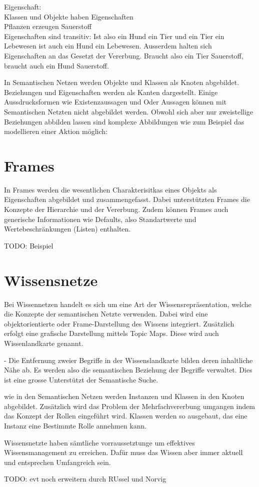 Eigenschaft:\\
\noindent\hspace*{15mm} Klassen und Objekte haben Eigenschaften\\
\noindent\hspace*{15mm} Pflanzen erzeugen Sauerstoff\\
Eigenschaften sind transitiv: Ist also ein Hund ein Tier und ein Tier ein Lebewesen ist auch ein Hund ein Lebewesen. Ausserdem halten sich Eigenschaften an das Gesetzt der Vererbung. Braucht also ein Tier Sauerstoff, braucht auch ein Hund Sauerstoff.

In Semantischen Netzen werden Objekte und Klassen als Knoten abgebildet. Beziehungen und Eigenschaften werden als Kanten dargestellt.
Einige Aussdrucksformen wie Existenzaussagen und Oder Aussagen können mit Semantischen Netzten nicht abgebildet werden. Obwohl sich aber nur zweistellige Beziehungen abbilden lassen sind komplexe Abbildungen wie zum Beispiel das modellieren einer Aktion möglich:

\section{Frames}
\label{sec:wissensrepFormen_frames}

In Frames werden die wesentlichen Charakterisitkas eines Objekts als Eigenschaften abgebildet und zusammengefasst. Dabei unterstützten Frames die Konzepte der Hierarchie und der Vererbung. Zudem können Frames auch generische Informationen wie Defaults, also Standartwerte und Wertebeschränkungen (Listen) enthalten.

TODO: Beispiel

\section{Wissensnetze}
\label{sec:wissensrepFormen_Wissensnetze}
Bei Wissennetzen handelt es sich um eine Art der Wissensrepräsentation, welche die Konzepte der semantischen Netzte verwenden. Dabei wird eine objektorientierte oder Frame-Darstellung des Wissens integriert. Zusätzlich erfolgt eine grafische Darstellung mittels Topic Maps. Diese wird auch Wissenlandkarte genannt. 

- Die Entfernung zweier Begriffe in der Wissenslandkarte bilden deren inhaltliche Nähe ab. Es werden also die semantischen Beziehung der Begriffe verwaltet. Dies ist eine grosse Unterstützt der Semantische Suche.

wie in den Semantischen Netzen werden Instanzen und Klassen in den Knoten abgebildet. Zusätzlich wird das Problem der Mehrfachvererbung umgangen indem das Konzept der Rollen eingeführt wird. Klassen werden so ausgebaut, das eine Instanz eine Bestimmte Rolle annehmen kann.
	
Wissensnetzte haben sämtliche vorraussetztunge um effektives Wissensmanagement zu erreichen. Dafür muss das Wissen aber immer aktuell und entsprechen Umfangreich sein.


TODO: evt noch erweitern durch RUssel und Norvig

